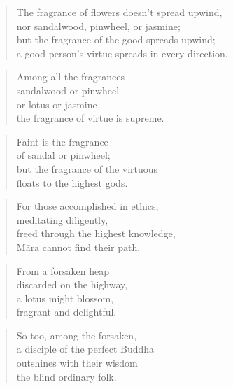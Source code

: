 \documentclass[12pt,openany]{book}%
\begin{document}
\begin{verse}%
The fragrance of flowers doesn’t spread upwind, \\
nor sandalwood, pinwheel, or jasmine; \\
but the fragrance of the good spreads upwind; \\
a good person’s virtue spreads in every direction. 

%
\end{verse}

\begin{verse}%
Among all the fragrances—\\
sandalwood or pinwheel \\
or lotus or jasmine—\\
the fragrance of virtue is supreme. 

%
\end{verse}

\begin{verse}%
Faint is the fragrance \\
of sandal or pinwheel; \\
but the fragrance of the virtuous \\
floats to the highest gods. 

%
\end{verse}

\begin{verse}%
For those accomplished in ethics, \\
meditating diligently, \\
freed through the highest knowledge, \\
\textsanskrit{Māra} cannot find their path. 

%
\end{verse}

\begin{verse}%
From a forsaken heap \\
discarded on the highway, \\
a lotus might blossom, \\
fragrant and delightful. 

%
\end{verse}

\begin{verse}%
So too, among the forsaken, \\
a disciple of the perfect Buddha \\
outshines with their wisdom \\
the blind ordinary folk. 

%
\end{verse}
\end{document}
